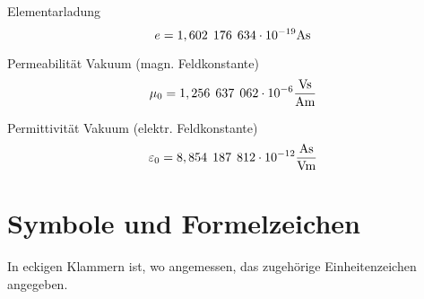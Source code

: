 \documentclass[11pt, a4paper, final, fleqn, twocolumn]{article}
\numberwithin{equation}{subsection}
\begin{document}
Elementarladung\footnotemark[1]
\begin{equation}
    e = 1,602 \hspace{1ex} 176 \hspace{1ex} 634 \cdot 10^{-19} \text{As}
\end{equation}

\noindent Permeabilität Vakuum (magn. Feldkonstante)\footnotemark[1]
\begin{equation}
    \mu_0 = 1,256 \hspace{1ex} 637 \hspace{1ex} 062 \cdot 10^{-6} \frac{\text{Vs}}{\text{Am}}
\end{equation}

\noindent Permittivität Vakuum (elektr. Feldkonstante)\footnotemark[1]
\begin{equation}
    \varepsilon_0 = 8,854 \hspace{1ex} 187 \hspace{1ex} 812 \cdot 10^{-12} \frac{\text{As}}{\text{Vm}}
\end{equation}




\section{Symbole und Formelzeichen}
\noindent In eckigen Klammern ist, wo angemessen, das zugehörige Einheitenzeichen angegeben. \\
\end{document}
